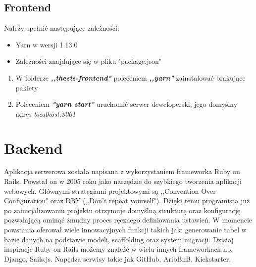 \documentclass[declaration,shortabstract]{iithesis}
\begin{document}
\subsection{Frontend}
Należy spełnić następujące zależności:
    \begin{itemize}
        \item Yarn w wersji 1.13.0
        \item Zależności znajdujące się w pliku "package.json" 
    \end{itemize}

\begin{enumerate}
    \item W folderze \textbf{\textit{,,thesis-frontend"}} poleceniem \textbf{\textit{,,yarn"}} zainstalować brakujące pakiety
    \item Poleceniem \textbf{\textit{"yarn start"}} uruchomić serwer deweloperski, jego domyślny adres \textit{localhost:3001}
\end{enumerate}

\section{Backend}
Aplikacja serwerowa została napisana z wykorzystaniem frameworka Ruby on Rails. Powstał on w 2005 roku jako narzędzie do szybkiego tworzenia aplikacji webowych. Głównymi strategiami projektowymi są ,,Convention Over Configuration" oraz DRY (,,Don't repeat yourself"). Dzięki temu programista już po zainicjalizowaniu projektu otrzymuje domyślną strukturę oraz konfigurację pozwalającą ominąć żmudny proces ręcznego definiowania ustawień. W momencie powstania oferował wiele innowacyjnych funkcji takich jak: generowanie tabel w bazie danych na podstawie modeli, scaffolding oraz system migracji. Dzisiaj inspiracje Ruby on Rails możemy znaleźć w wielu innych frameworkach np. Django, Sails.js. Napędza serwisy takie jak GitHub, AribBnB, Kickstarter.
\end{document}
